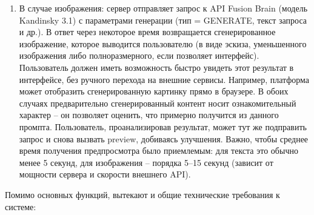 \begin{enumerate}[label=\arabic*.]
\begin{enumerate}[label=4.\arabic*.]
        \item В случае изображения: сервер отправляет запрос к API Fusion Brain (модель Kandinsky 3.1) с параметрами генерации (тип = GENERATE, текст запроса и др.). В ответ через некоторое время возвращается сгенерированное изображение, которое выводится пользователю (в виде эскиза, уменьшенного изображения либо полноразмерного, если позволяет интерфейс). Пользователь должен иметь возможность быстро увидеть этот результат в интерфейсе, без ручного перехода на внешние сервисы. Например, платформа может отобразить сгенерированную картинку прямо в браузере. В обоих случаях предварительно сгенерированный контент носит ознакомительный характер – он позволяет оценить, что примерно получится из данного промпта. Пользователь, проанализировав результат, может тут же подправить запрос и снова вызвать preview, добиваясь улучшения. Важно, чтобы среднее время получения предпросмотра было приемлемым: для текста это обычно менее 5 секунд, для изображения – порядка 5–15 секунд (зависит от мощности сервера и скорости внешнего API).
    \end{enumerate}
\end{enumerate}
Помимо основных функций, вытекают и общие технические требования к системе: 

